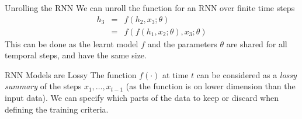 \documentclass[11pt,a4paper]{article}
\begin{document}
  \begin{proposition}{Unrolling the RNN}
    We can unroll the function for an RNN over finite time steps
    \[\begin{array}{rcl}
      h_3&=&f(h_2,x_3;\theta)\\
      &=&f(f(h_1,x_2;\theta),x_3;\theta)
    \end{array}\]
    This can be done as the learnt model $f$ and the parameters $\theta$ are shared for all temporal steps, and have the same size.
  \end{proposition}

  \begin{remark}{RNN Models are Lossy}
    The function $f(\cdot)$ at time $t$ can be considered as a \textit{lossy summary} of the steps $x_1,\dots,x_{t-1}$ (as the function is on lower dimension than the input data). We can specify which parts of the data to keep or discard when defining the training criteria.
  \end{remark}
\end{document}
